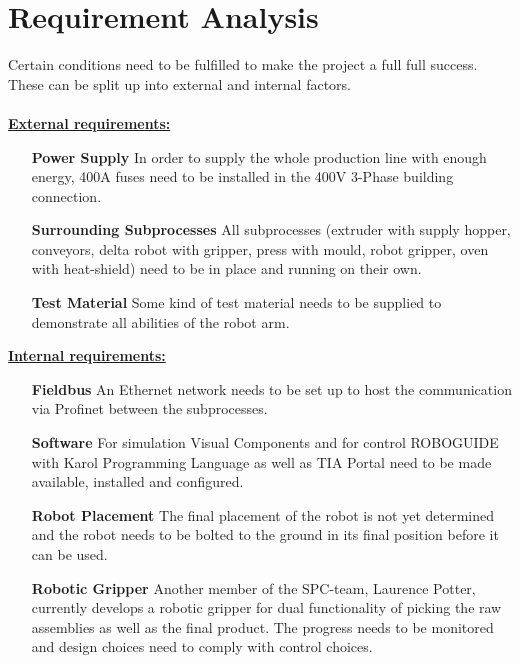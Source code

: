 
\chapter{Requirement Analysis}

Certain conditions need to be fulfilled to make the project a full full success. 
These can be split up into external and internal factors.\\
\\
\underline{\textbf{External requirements:}}\vspace{2mm}
\begin{itemize}[leftmargin=5cm]
	\item[\textbf{Power Supply}] In order to supply the whole production line with enough energy, 400A fuses need to be installed in the 400V 3-Phase building connection.
	\item[\textbf{Surrounding Subprocesses}] All subprocesses (extruder with supply hopper, conveyors, delta robot with gripper, press with mould, robot gripper, oven with heat-shield) need to be in place and running on their own.
	\item[\textbf{Test Material}] Some kind of test material needs to be supplied to demonstrate all abilities of the robot arm.
\end{itemize}
\bigskip
\underline{\textbf{Internal requirements:}}\vspace{2mm}
\begin{itemize}[leftmargin=5cm]
	\item[\textbf{Fieldbus}] An Ethernet network needs to be set up to host the communication via Profinet between the subprocesses.
	\item[\textbf{Software}] For simulation Visual Components and for control ROBOGUIDE with Karol Programming Language as well as TIA Portal need to be made available, installed and configured. 
	\item[\textbf{Robot Placement}] The final placement of the robot is not yet determined and the robot needs to be bolted to the ground in its final position before it can be used.
	\item[\textbf{Robotic Gripper}] Another member of the SPC-team, Laurence Potter, currently develops a robotic gripper for dual functionality of picking the raw assemblies as well as the final product. The progress needs to be monitored and design choices need to comply with control choices.
\end{itemize}
\bigskip

